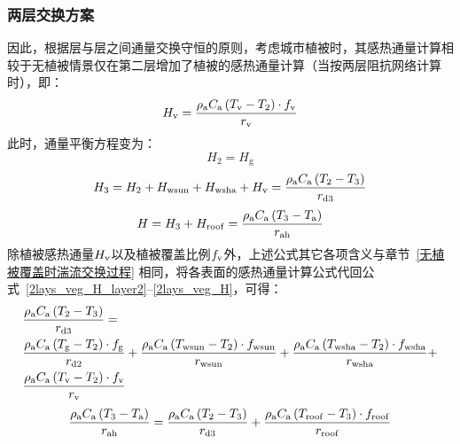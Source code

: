 \subsubsection{两层交换方案}\label{两层方案_植被}
因此，根据层与层之间通量交换守恒的原则，考虑城市植被时，其感热通量计算相较于无植被情景仅在第二层增加了植被的感热通量计算（当按两层阻抗网络计算时），即：
\begin{equation}
  H_{\mathrm{v}} = \frac{\rho _{\rm a} C_{\mathrm a} \left( T_{\mathrm{v}} - T_{2} \right) \cdot f_{\rm v}}{r_{\mathrm{v}}}
\end{equation}
此时，通量平衡方程变为：
\begin{equation}\label{2lays_veg_H_layer2}
  H_{2} = H_{\mathrm{g}}
\end{equation}
%
\begin{equation}\label{2lays_veg_H_layer3}
  H_{3} = H_{2} + H_{\mathrm{wsun}} + H_{\mathrm{wsha}} + H_{\mathrm{v}} = \frac{\rho _{\rm a} C_{\mathrm a} \left( T_{2} - T_{3} \right)}{r_{\mathrm{d3}}}
\end{equation}
%
\begin{equation}\label{2lays_veg_H}
  H = H_{3} + H_{\mathrm{roof}} = \frac{\rho _{\rm a} C_{\mathrm a} \left( T_{3} - T_{\rm a} \right)}{r_{\mathrm{ah}}}
\end{equation}
除植被感热通量$H_{\rm v}$以及植被覆盖比例$f_{\rm v}$外，上述公式其它各项含义与章节~\ref{无植被覆盖时湍流交换过程} 相同，将各表面的感热通量计算公式代回公式~\eqref{2lays_veg_H_layer2}--\eqref{2lays_veg_H}，可得：
\begin{equation}
  \begin{split}
    & \frac{\rho _{\rm a} C_{\mathrm a} \left( T_{2} - T_{3} \right)}{r_{\mathrm{d3}}} = \\
    & \frac{\rho _{\rm a} C_{\mathrm a} \left( T_{\mathrm{g}} - T_{2} \right) \cdot f_{\mathrm{g}}}{r_{\mathrm{d2}}} + \frac{\rho _{\rm a} C_{\mathrm a} \left( T_{\mathrm{wsun}} - T_{2} \right) \cdot f_{\mathrm{wsun}}}{r_{\mathrm{wsun}}} + \frac{\rho _{\rm a} C_{\mathrm a} \left( T_{\mathrm{wsha}} - T_{2} \right) \cdot f_{\mathrm{wsha}}}{r_{\mathrm{wsha}}} +
    \\
    & \frac{\rho _{\rm a} C_{\mathrm a} \left( T_{\mathrm{v}} - T_{2} \right) \cdot f_{\rm v}}{r_{\mathrm{v}}}
  \end{split}
\end{equation}
%
\begin{equation}
  \begin{split}
    \frac{\rho _{\rm a} C_{\mathrm a} \left( T_{3} - T_{\rm a} \right)}{r_{\mathrm{ah}}} =
    \frac{\rho _{\rm a} C_{\mathrm a} \left( T_{2} - T_{3} \right)}{r_{\mathrm{d3}}} + \frac{\rho _{\rm a} C_{\mathrm a} \left( T_{\mathrm{roof}} - T_{3} \right)\cdot f_{\mathrm{roof}}}{r_{\mathrm{roof}}}
  \end{split}
\end{equation}
